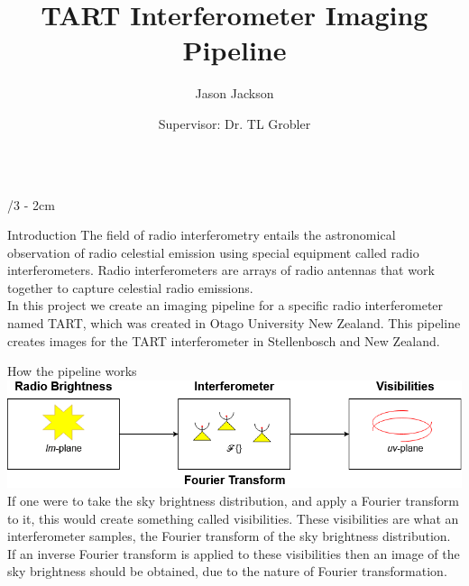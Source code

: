 \documentclass[landscape]{uioposter}
\title{TART Interferometer Imaging Pipeline}
\author
{%
    Jason Jackson%
    \and
    Supervisor: Dr. TL Grobler%
}
\institute
{
    \inst{} Stellenbosch University \and Department of Computer Science
}
\begin{document}
\begin{frame}
\vspace{-0.8cm}
\begin{columns}[onlytextwidth]


\begin{column}{\textwidth/3 - 2cm}
    \begin{block}{Introduction}
        The field of radio interferometry entails the astronomical observation of radio celestial emission using special equipment called radio interferometers. Radio interferometers are arrays of radio antennas that work together to capture celestial radio emissions.\\
        In this project we create an imaging pipeline for a specific radio interferometer named TART, which was created in Otago University New Zealand. This pipeline creates images for the TART interferometer in Stellenbosch and New Zealand.
    \end{block}

    \begin{block}{How the pipeline works}
        \includegraphics[scale=1.2]{Images/Radio_Interferometry.png}
        If one were to take the sky brightness distribution, and apply a Fourier transform to it, this would create something called visibilities. These visibilities are what an interferometer samples, the Fourier transform of the sky brightness distribution. If an inverse Fourier transform is applied to these visibilities then an image of the sky brightness should be obtained, due to the nature of Fourier transformation.
    \end{block}
\end{column}



\end{columns}
\end{frame}
\end{document}
